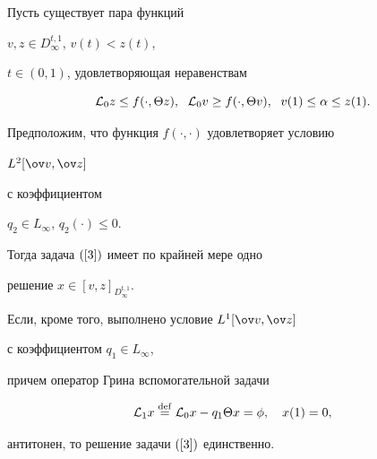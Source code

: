 \begin{thmnonum}


Пусть существует пара функций


$v, z \in D_{\infty}^{t,1}$, $v(t) < z(t)$,


$t\in (0,1)$, удовлетворяющая неравенствам


$$


{\cal L}_0 z\le f(\cdot, \Theta z),


\ \; {\cal L}_0 v\ge f(\cdot, \Theta v),


\ \; v(1)\le \alpha \le z(1).


$$


Предположим, что функция $f(\cdot,\cdot)$ удовлетворяет условию


$L^2[\ov v, \ov z]$


с коэффициентом


$q_2\in L_\infty$, $q_2(\cdot)\le 0$.


Тогда задача $(\ref{3})$ имеет по крайней мере одно


решение $x\in [v,z]_{D_{\infty}^{t,1}}$.





Если, кроме того, выполнено условие $L^1[\ov v, \ov z]$


с коэффициентом $q_1\in { L}_\infty$,


причем оператор Грина вспомогательной задачи


$$


{\cal L}_1 x\eqdef{\cal L}_0 x - q_1 \Theta x=


\phi,\quad x(1) = 0,


$$


антитонен, то решение задачи $(\ref{3})$ единственно.


\end{thmnonum}





